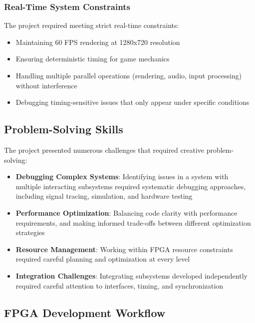 \documentclass[12pt,a4paper]{article}
\begin{document}
\subsubsection{Real-Time System Constraints}
The project required meeting strict real-time constraints:
\begin{itemize}
    \item Maintaining 60 FPS rendering at 1280x720 resolution
    \item Ensuring deterministic timing for game mechanics
    \item Handling multiple parallel operations (rendering, audio, input processing) without interference
    \item Debugging timing-sensitive issues that only appear under specific conditions
\end{itemize}

\subsection{Problem-Solving Skills}

The project presented numerous challenges that required creative problem-solving:
\begin{itemize}
    \item \textbf{Debugging Complex Systems}: Identifying issues in a system with multiple interacting subsystems required systematic debugging approaches, including signal tracing, simulation, and hardware testing
    \item \textbf{Performance Optimization}: Balancing code clarity with performance requirements, and making informed trade-offs between different optimization strategies
    \item \textbf{Resource Management}: Working within FPGA resource constraints required careful planning and optimization at every level
    \item \textbf{Integration Challenges}: Integrating subsystems developed independently required careful attention to interfaces, timing, and synchronization
\end{itemize}

\subsection{FPGA Development Workflow}
\end{document}
